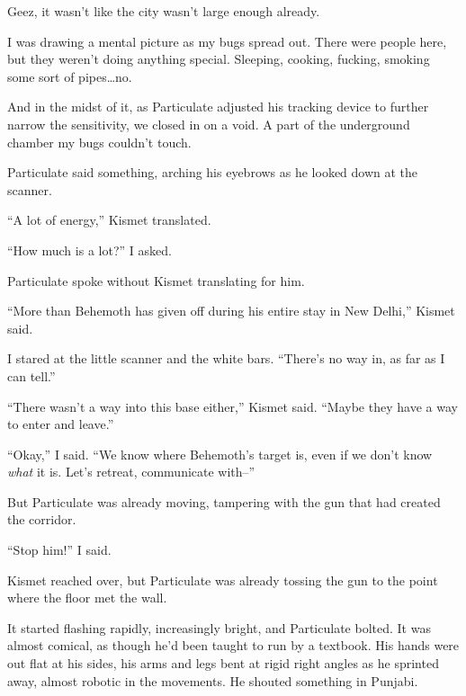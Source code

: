 Geez, it wasn't like the city wasn't large enough already.



I was drawing a mental picture as my bugs spread out.  There were people here, but they weren't doing anything special.  Sleeping, cooking, fucking, smoking some sort of pipes\ldots no.



And in the midst of it, as Particulate adjusted his tracking device to further narrow the sensitivity, we closed in on a void.  A part of the underground chamber my bugs couldn't touch.



Particulate said something, arching his eyebrows as he looked down at the scanner.



``A lot of energy,'' Kismet translated.



``How much is a lot?'' I asked.



Particulate spoke without Kismet translating for him.



``More than Behemoth has given off during his entire stay in New Delhi,'' Kismet said.



I stared at the little scanner and the white bars.  ``There's no way in, as far as I can tell.''



``There wasn't a way into this base either,'' Kismet said.  ``Maybe they have a way to enter and leave.''



``Okay,'' I said.  ``We know where Behemoth's target is, even if we don't know \emph{what} it is.  Let's retreat, communicate with--''



But Particulate was already moving, tampering with the gun that had created the corridor.



``Stop him!'' I said.



Kismet reached over, but Particulate was already tossing the gun to the point where the floor met the wall.



It started flashing rapidly, increasingly bright, and Particulate bolted.  It was almost comical, as though he'd been taught to run by a textbook.  His hands were out flat at his sides, his arms and legs bent at rigid right angles as he sprinted away, almost robotic in the movements.  He shouted something in Punjabi.



